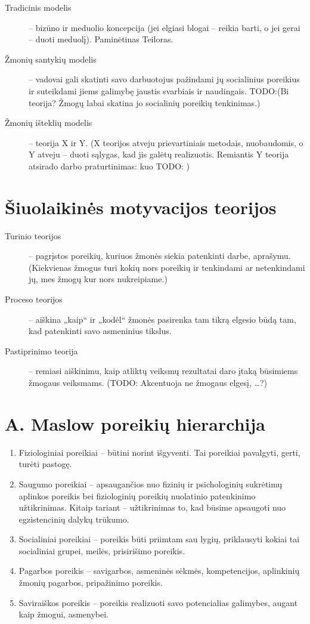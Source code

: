 \begin{description}
  \item[Tradicinis modelis] – bizūno ir meduolio koncepcija (jei elgiasi
    blogai – reikia barti, o jei gerai – duoti meduolį). Paminėtinas
    Teiloras.
  \item[Žmonių santykių modelis] – vadovai gali skatinti savo darbuotojus
    pažindami jų socialinius poreikius ir suteikdami jiems galimybę
    jaustis svarbiais ir naudingais. TODO:(Bi~ teorija? Žmogų labai skatina
    jo socialinių poreikių tenkinimas.)
  \item[Žmonių išteklių modelis] – teorija X ir Y. (X teorijos atveju
    prievartiniais metodais, nuobaudomis, o Y atveju – duoti sąlygas,
    kad jis galėtų realizuotis. Remiantis Y teorija atsirado darbo
    praturtinimas: kuo TODO: )
\end{description}

\section{Šiuolaikinės motyvacijos teorijos}

\begin{description}
  \item[Turinio teorijos] – pagrįstos poreikių, kuriuos žmonės siekia 
    patenkinti darbe, aprašymu. (Kiekvienas žmogus turi kokių nors
    poreikių ir tenkindami ar netenkindami jų, mes žmogų kur nors
    nukreipiame.)
  \item[Proceso teorijos] – aiškina „kaip“ ir „kodėl“ žmonės pasirenka
    tam tikrą elgesio būdą tam, kad patenkinti savo asmeninius tikslus.
  \item[Pastiprinimo teorija] – remiasi aiškinimu, kaip atliktų
    veiksmų rezultatai daro įtaką būsimiems žmogaus veiksmams. (TODO:
    Akcentuoja ne žmogaus elgesį, …?)
\end{description}

\section{A. Maslow poreikių hierarchija}

\begin{enumerate}
  \item Fiziologiniai poreikiai – būtini norint išgyventi. Tai poreikiai
    pavalgyti, gerti, turėti pastogę.
  \item Saugumo poreikiai – apsaugančios nuo fizinių ir psichologinių
    sukrėtimų aplinkos poreikis bei fiziologinių poreikių nuolatinio
    patenkinimo užtikrinimas. Kitaip tariant – užtikrinimas to, kad
    būsime apsaugoti nuo egzistencinių dalykų trūkumo.
  \item Socialiniai poreikiai – poreikis būti priimtam sau lygių,
    priklausyti kokiai tai socialiniai grupei, meilės, prisirišimo
    poreikis.
  \item Pagarbos poreikis – savigarbos, asmeninės sėkmės, kompetencijos,
    aplinkinių žmonių pagarbos, pripažinimo poreikis.
  \item Saviraiškos poreikis – poreikis realizuoti savo potencialias
    galimybes, augant kaip žmogui, asmenybei.
\end{enumerate}

